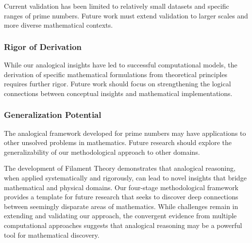 Current validation has been limited to relatively small datasets and specific ranges of prime numbers. Future work must extend validation to larger scales and more diverse mathematical contexts.

\subsubsection{Rigor of Derivation}

While our analogical insights have led to successful computational models, the derivation of specific mathematical formulations from theoretical principles requires further rigor. Future work should focus on strengthening the logical connections between conceptual insights and mathematical implementations.

\subsubsection{Generalization Potential}

The analogical framework developed for prime numbers may have applications to other unsolved problems in mathematics. Future research should explore the generalizability of our methodological approach to other domains.

\begin{conclusion}
The development of Filament Theory demonstrates that analogical reasoning, when applied systematically and rigorously, can lead to novel insights that bridge mathematical and physical domains. Our four-stage methodological framework provides a template for future research that seeks to discover deep connections between seemingly disparate areas of mathematics. While challenges remain in extending and validating our approach, the convergent evidence from multiple computational approaches suggests that analogical reasoning may be a powerful tool for mathematical discovery.
\end{conclusion}
